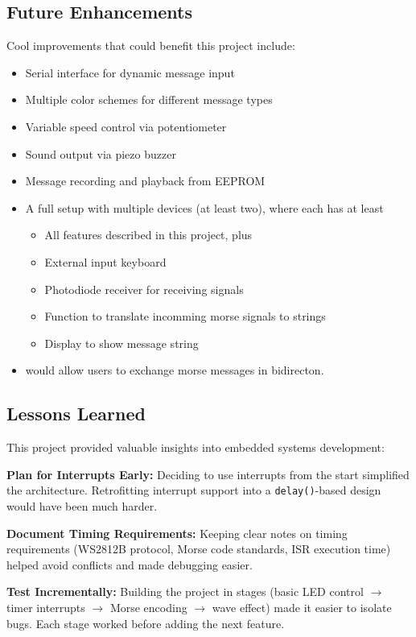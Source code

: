 \documentclass[report]{IEEEtran}
\begin{document}
\subsection{Future Enhancements}\label{sec:Enhancements}
Cool improvements that could benefit this project include:
\begin{itemize}
    \item Serial interface for dynamic message input
    \item Multiple color schemes for different message types
    \item Variable speed control via potentiometer
    \item Sound output via piezo buzzer
    \item Message recording and playback from EEPROM
    \item A full setup with multiple devices (at least two), where each has at least
    \begin{itemize}    
        \item All features described in this project, plus
        \item External input keyboard
        \item Photodiode receiver for receiving signals
        \item Function to translate incomming morse signals to strings
        \item Display to show message string
    \end{itemize}
    \item[] would allow users to exchange morse messages in bidirecton. 
\end{itemize}

\subsection{Lessons Learned}
This project provided valuable insights into embedded systems development:

\textbf{Plan for Interrupts Early:}
Deciding to use interrupts from the start simplified the architecture. Retrofitting interrupt support into a \texttt{delay()}-based design would have been much harder.

\textbf{Document Timing Requirements:}
Keeping clear notes on timing requirements (WS2812B protocol, Morse code standards, ISR execution time) helped avoid conflicts and made debugging easier.

\textbf{Test Incrementally:}
Building the project in stages (basic LED control $\rightarrow$ timer interrupts $\rightarrow$ Morse encoding $\rightarrow$ wave effect) made it easier to isolate bugs. Each stage worked before adding the next feature.
\end{document}
